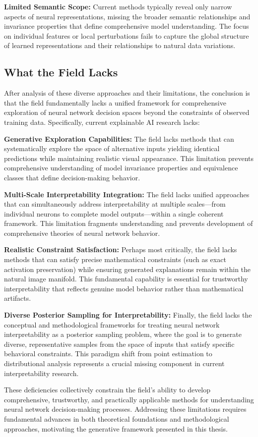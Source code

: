 \textbf{Limited Semantic Scope:} Current methods typically reveal only narrow aspects of neural representations, missing the broader semantic relationships and invariance properties that define comprehensive model understanding. The focus on individual features or local perturbations fails to capture the global structure of learned representations and their relationships to natural data variations.

\subsection{What the Field Lacks}

After analysis of these diverse approaches and their limitations, the conclusion is that the field fundamentally lacks a unified framework for comprehensive exploration of neural network decision spaces beyond the constraints of observed training data. Specifically, current explainable AI research lacks:

\textbf{Generative Exploration Capabilities:} The field lacks methods that can systematically explore the space of alternative inputs yielding identical predictions while maintaining realistic visual appearance. This limitation prevents comprehensive understanding of model invariance properties and equivalence classes that define decision-making behavior.

\textbf{Multi-Scale Interpretability Integration:} The field lacks unified approaches that can simultaneously address interpretability at multiple scales—from individual neurons to complete model outputs—within a single coherent framework. This limitation fragments understanding and prevents development of comprehensive theories of neural network behavior.

\textbf{Realistic Constraint Satisfaction:} Perhaps most critically, the field lacks methods that can satisfy precise mathematical constraints (such as exact activation preservation) while ensuring generated explanations remain within the natural image manifold. This fundamental capability is essential for trustworthy interpretability that reflects genuine model behavior rather than mathematical artifacts.

\textbf{Diverse Posterior Sampling for Interpretability:} Finally, the field lacks the conceptual and methodological frameworks for treating neural network interpretability as a posterior sampling problem, where the goal is to generate diverse, representative samples from the space of inputs that satisfy specific behavioral constraints. This paradigm shift from point estimation to distributional analysis represents a crucial missing component in current interpretability research.

These deficiencies collectively constrain the field's ability to develop comprehensive, trustworthy, and practically applicable methods for understanding neural network decision-making processes. Addressing these limitations requires fundamental advances in both theoretical foundations and methodological approaches, motivating the generative framework presented in this thesis.
